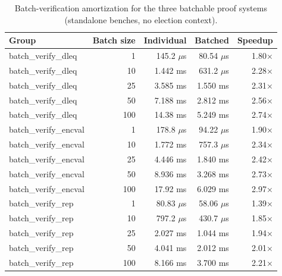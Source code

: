 \begin{table}[h]
  \centering
  \caption{Batch-verification amortization for the three batchable proof systems (standalone benches, no election context).}
  \label{tab:g3_batch_amortization}
  \begin{tabular}{lrrrr}
    \toprule
    Group & Batch size & Individual & Batched & Speedup \\
    \midrule
batch\_verify\_dleq & 1 & 145.2 $\mu$s & 80.54 $\mu$s & 1.80× \\
batch\_verify\_dleq & 10 & 1.442 ms & 631.2 $\mu$s & 2.28× \\
batch\_verify\_dleq & 25 & 3.585 ms & 1.550 ms & 2.31× \\
batch\_verify\_dleq & 50 & 7.188 ms & 2.812 ms & 2.56× \\
batch\_verify\_dleq & 100 & 14.38 ms & 5.249 ms & 2.74× \\
batch\_verify\_encval & 1 & 178.8 $\mu$s & 94.22 $\mu$s & 1.90× \\
batch\_verify\_encval & 10 & 1.772 ms & 757.3 $\mu$s & 2.34× \\
batch\_verify\_encval & 25 & 4.446 ms & 1.840 ms & 2.42× \\
batch\_verify\_encval & 50 & 8.936 ms & 3.268 ms & 2.73× \\
batch\_verify\_encval & 100 & 17.92 ms & 6.029 ms & 2.97× \\
batch\_verify\_rep & 1 & 80.83 $\mu$s & 58.06 $\mu$s & 1.39× \\
batch\_verify\_rep & 10 & 797.2 $\mu$s & 430.7 $\mu$s & 1.85× \\
batch\_verify\_rep & 25 & 2.027 ms & 1.044 ms & 1.94× \\
batch\_verify\_rep & 50 & 4.041 ms & 2.012 ms & 2.01× \\
batch\_verify\_rep & 100 & 8.166 ms & 3.700 ms & 2.21× \\
    \bottomrule
  \end{tabular}
\end{table}
